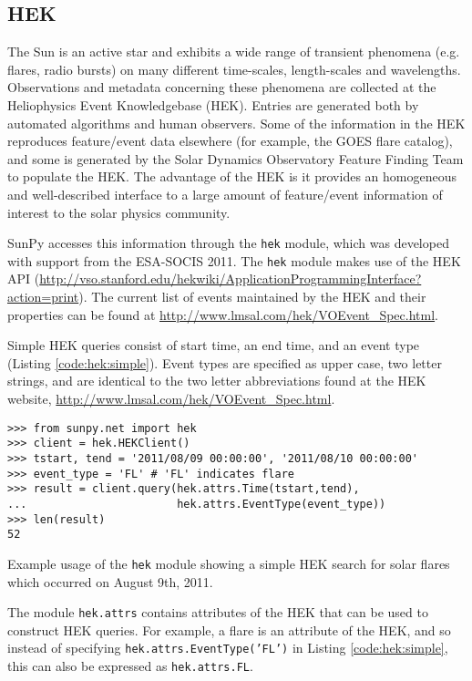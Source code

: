 \subsection{HEK}\label{ssec:hek}

The Sun is an active star and exhibits a wide range of transient phenomena (e.g. flares, 
radio bursts) on many 
different time-scales, length-scales and wavelengths. Observations and metadata 
concerning these phenomena are collected at the Heliophysics Event 
Knowledgebase (HEK).  Entries are generated both by automated algorithms and 
human observers.  Some of the information in the HEK reproduces feature/event 
data elsewhere (for example, the GOES flare catalog), and some is generated by 
the Solar Dynamics Observatory Feature Finding Team \cite{martens2012} to
populate the HEK.  The advantage of the HEK is it provides an homogeneous and 
well-described interface to a large 
amount of feature/event information of interest to the solar physics community.

SunPy accesses this information through the \texttt{hek} module, which was 
developed with support from the 
ESA-SOCIS 2011.  The \texttt{hek} module makes use of the HEK API
(\url{http://vso.stanford.edu/hekwiki/ApplicationProgrammingInterface?action=print}).
The current list of 
events maintained by the HEK and their properties can be found at 
\url{http://www.lmsal.com/hek/VOEvent_Spec.html}.

Simple HEK queries consist of start time, an end time, and an event type 
(Listing \ref{code:hek:simple}). Event types are specified as upper case, 
two letter strings, and are 
identical to the two letter abbreviations found at the HEK website, 
\url{http://www.lmsal.com/hek/VOEvent_Spec.html}.

\begin{listing}[H]
\begin{verbatim}
>>> from sunpy.net import hek
>>> client = hek.HEKClient()
>>> tstart, tend = '2011/08/09 00:00:00', '2011/08/10 00:00:00'
>>> event_type = 'FL' # 'FL' indicates flare
>>> result = client.query(hek.attrs.Time(tstart,tend), 
...                       hek.attrs.EventType(event_type))
>>> len(result)
52
\end{verbatim}
\caption{Example usage of the \texttt{hek} module showing a simple HEK search for solar flares
which occurred on August 9th, 2011.}
\label{code:hek:simple}
\end{listing}

The module \texttt{hek.attrs} contains attributes of the HEK that can be used to
construct HEK queries.  For example, a flare is an attribute of the HEK, and so 
instead of specifying \texttt{hek.attrs.EventType('FL')} in Listing 
\ref{code:hek:simple}, this can also be expressed as \texttt{hek.attrs.FL}. 

